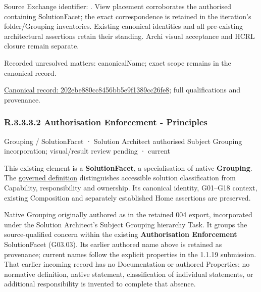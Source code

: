 Source Exchange identifier: \texttt{}. View placement corroborates
the authorised containing SolutionFacet; the exact correspondence is retained in the
iteration's folder/Grouping inventories. Existing canonical identities and all
pre-existing architectural assertions retain their standing. Archi visual
acceptance and HCRL closure remain separate.


{\small Recorded unresolved matters: canonicalName; exact scope remains in the canonical record.}\par
{\footnotesize \href{../../../../../../../continuum/grouping/202ebe880cc8456bb5e9f1389cc26fe8.md}{Canonical record: 202ebe880cc8456bb5e9f1389cc26fe8}; full qualifications and provenance.}\par
\subsubsection*{R.3.3.3.2 Authorisation Enforcement - Principles}
\label{navigation:R.3.3.3.2}

\label{element:f85948e2b4e145a4b56ab369c1a70c22}
{\small Grouping / SolutionFacet · Solution Architect authorised Subject Grouping incorporation; visual/result review pending · current}\par

This existing element is a \textbf{SolutionFacet}, a specialisation of native
\textbf{Grouping}. The \href{\detokenize{../../../../../../../governance/continuum-representation.md#solutionfacet-classification--1119-candidate}}{governed definition}
distinguishes accessible solution classification from Capability, responsibility
and ownership. Its canonical identity, G01–G18 context, existing Composition
and separately established Home assertions are preserved.



Native Grouping originally authored as \texttt{} in the retained 004 export,
incorporated under the Solution Architect's Subject Grouping hierarchy Task.
It groups the source-qualified \texttt{} concern within
the existing \textbf{Authorisation Enforcement} SolutionFacet (G03.03). Its earlier authored name above is retained as provenance; current names
follow the explicit properties in the 1.1.19 submission.
That earlier incoming record has no Documentation or authored Properties; no normative
definition, native statement, classification of individual statements, or
additional responsibility is invented to complete that absence.



